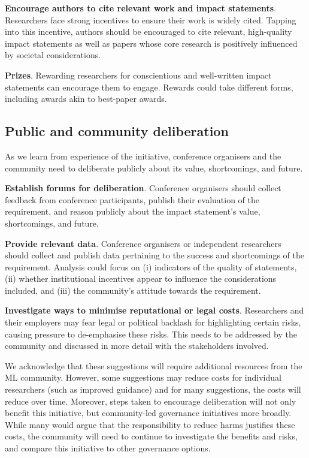 \documentclass[11pt,english]{article}
\begin{document}
	\textbf{Encourage authors to cite relevant work and impact statements}. Researchers face strong incentives to ensure their work is widely cited. Tapping into this incentive, authors should be encouraged to cite relevant, high-quality impact statements as well as papers whose core research is positively influenced by societal considerations. 
	
	\textbf{Prizes}. Rewarding researchers for conscientious and well-written impact statements can encourage them to engage. Rewards could take different forms, including awards akin to best-paper awards. 
	
	\subsection*{Public and community deliberation}
	
	As we learn from experience of the initiative, conference organisers and the community need to deliberate publicly about its value, shortcomings, and future. 
	
	\textbf{Establish forums for deliberation}. Conference organisers should collect feedback from conference participants, publish their evaluation of the requirement, and reason publicly about the impact statement's value, shortcomings, and future. 
	
	\textbf{Provide relevant data}. Conference organisers or independent researchers should collect and publish data pertaining to the success and shortcomings of the requirement. Analysis could focus on (i) indicators of the quality of statements, (ii) whether institutional incentives appear to influence the considerations included, and (iii) the community's attitude towards the requirement. 
	
	\textbf{Investigate ways to minimise reputational or legal costs}. Researchers and their employers may fear legal or political backlash for highlighting certain risks, causing pressure to de-emphasise these risks. This needs to be addressed by the community and discussed in more detail with the stakeholders involved.
	
	
	
	We acknowledge that these suggestions will require additional resources from the ML community. However, some suggestions may reduce costs for individual researchers (such as improved guidance) and for many suggestions, the costs will reduce over time. Moreover, steps taken to encourage deliberation will not only benefit this initiative, but community-led governance initiatives more broadly. While many would argue that the responsibility to reduce harms justifies these costs, the community will need to continue to investigate the benefits and risks, and compare this initiative to other governance options.
	
\end{document}
